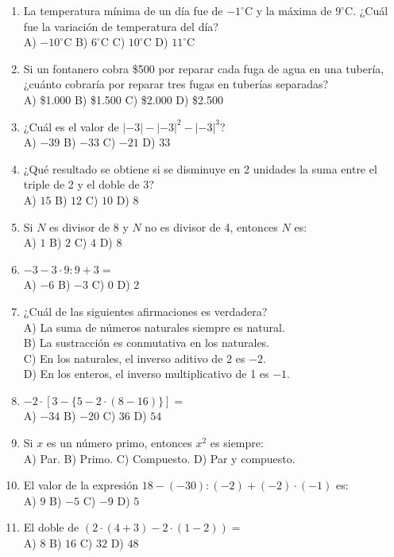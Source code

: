 \documentclass[11pt,letterpaper]{article}
\begin{document}
\begin{enumerate}[label=\textbf{\arabic*.}, leftmargin=*, itemsep=7pt]
\item La temperatura mínima de un día fue de $-1^\circ\mathrm{C}$ y la máxima de $9^\circ\mathrm{C}$. ¿Cuál fue la variación de temperatura del día?\\ A) $-10^\circ\mathrm{C}$ \quad B) $6^\circ\mathrm{C}$ \quad C) $10^\circ\mathrm{C}$ \quad D) $11^\circ\mathrm{C}$
\item Si un fontanero cobra \$500 por reparar cada fuga de agua en una tubería, ¿cuánto cobraría por reparar tres fugas en tuberías separadas?\\ A) \$1.000 \quad B) \$1.500 \quad C) \$2.000 \quad D) \$2.500
\item ¿Cuál es el valor de $|-3|-|-3|^2-|-3|^3$?\\ A) $-39$ \quad B) $-33$ \quad C) $-21$ \quad D) $33$
\item ¿Qué resultado se obtiene si se disminuye en 2 unidades la suma entre el triple de 2 y el doble de 3?\\ A) $15$ \quad B) $12$ \quad C) $10$ \quad D) $8$
\item Si $N$ es divisor de 8 y $N$ no es divisor de 4, entonces $N$ es: \\ A) $1$ \quad B) $2$ \quad C) $4$ \quad D) $8$
\item $-3-3\cdot 9:9+3=$\\ A) $-6$ \quad B) $-3$ \quad C) $0$ \quad D) $2$
\item ¿Cuál de las siguientes afirmaciones es verdadera?\\ A) La suma de números naturales siempre es natural.\\ B) La sustracción es conmutativa en los naturales.\\ C) En los naturales, el inverso aditivo de 2 es $-2$.\\ D) En los enteros, el inverso multiplicativo de 1 es $-1$.
\item $-2\cdot[3-\{5-2\cdot(8-16)\}]=$\\ A) $-34$ \quad B) $-20$ \quad C) $36$ \quad D) $54$
\item Si $x$ es un número primo, entonces $x^2$ es siempre: \\ A) Par. \quad B) Primo. \quad C) Compuesto. \quad D) Par y compuesto.
\item El valor de la expresión $18-(-30):(-2)+(-2)\cdot(-1)$ es: \\ A) $9$ \quad B) $-5$ \quad C) $-9$ \quad D) $5$
\item El doble de $(2\cdot(4+3)-2\cdot(1-2))=$\\ A) $8$ \quad B) $16$ \quad C) $32$ \quad D) $48$

\end{enumerate}
\end{document}
